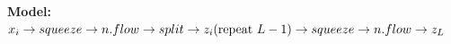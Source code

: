 \textbf{Model:} $x_i \rightarrow squeeze \rightarrow n.flow \rightarrow split \rightarrow z_i (\text{repeat } L-1)\\
\rightarrow squeeze \rightarrow n.flow \rightarrow z_L$\\

